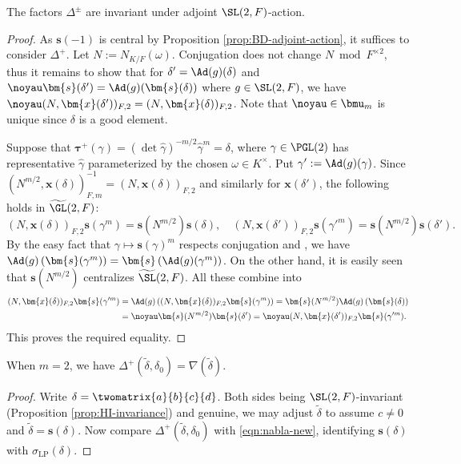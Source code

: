 \documentclass[a4paper,10pt]{article}
\begin{document}
\begin{proposition}\label{prop:HI-invariance}
	The factors $\Delta^\pm$ are invariant under adjoint $\SL(2,F)$-action.
\end{proposition}
\begin{proof}
	As $\bm{s}(-1)$ is central by Proposition \ref{prop:BD-adjoint-action}, it suffices to consider $\Delta^+$. Let $N := N_{K/F}(\omega)$. Conjugation does not change $N \bmod F^{\times 2}$, thus it remains to show that for $\delta' = \Ad(g)(\delta)$ and $\noyau \bm{s}(\delta') = \Ad(g)(\bm{s}(\delta))$ where $g \in \SL(2,F)$, we have $\noyau (N, \bm{x}(\delta'))_{F,2} = (N, \bm{x}(\delta))_{F,2}$. Note that $\noyau \in \bmu_m$ is unique since $\delta$ is a good element.
	
	Suppose that $\bm{\tau}^+(\gamma) = (\det\hat{\gamma})^{-m/2} \hat{\gamma}^m = \delta$, where $\gamma \in \PGL(2)$ has representative $\hat{\gamma}$ parameterized by the chosen $\omega \in K^\times$. Put $\gamma' := \Ad(g)(\gamma)$. Since $\left( N^{m/2}, \bm{x}(\delta) \right)^{-1}_{F, m} = (N, \bm{x}(\delta))_{F,2}$ and similarly for $\bm{x}(\delta')$, the following holds in $\widetilde{\GL}(2,F)$:
	\[ (N, \bm{x}(\delta))_{F,2} \bm{s}(\gamma^m) = \bm{s}(N^{m/2}) \bm{s}(\delta), \quad (N, \bm{x}(\delta'))_{F,2} \bm{s}(\gamma'^m) = \bm{s}(N^{m/2}) \bm{s}(\delta'). \]
	By the easy fact that $\gamma \mapsto \bm{s}(\gamma)^m$ respects conjugation and \cite[p.130 + Lemma 1.2.1]{Fl80}, we have $\Ad(g)\left( \bm{s}(\gamma^m) \right) = \bm{s}\left( \Ad(g)(\gamma^m) \right)$. On the other hand, it is easily seen that $\bm{s}(N^{m/2})$ centralizes $\widetilde{\SL}(2,F)$. All these combine into
	\begin{align*}
		(N, \bm{x}(\delta))_{F,2} \bm{s}(\gamma'^m) & = \Ad(g) \left( (N, \bm{x}(\delta))_{F,2} \bm{s}(\gamma^m) \right) = \bm{s}(N^{m/2}) \Ad(g) \left( \bm{s}(\delta) \right) \\
		& = \noyau \bm{s}(N^{m/2}) \bm{s}(\delta') = \noyau (N, \bm{x}(\delta'))_{F,2} \bm{s}(\gamma'^m).
	\end{align*}
	This proves the required equality.
\end{proof}

\begin{proposition}\label{prop:HI-Li}
	When $m=2$, we have $\Delta^+(\tilde{\delta}, \delta_0) = \nabla(\tilde{\delta})$.
\end{proposition}
\begin{proof}
	Write $\delta = \twomatrix{a}{b}{c}{d}$. Both sides being $\SL(2,F)$-invariant (Proposition \ref{prop:HI-invariance}) and genuine, we may adjust $\tilde{\delta}$ to assume $c \neq 0$ and $\tilde{\delta} = \bm{s}(\delta)$. Now compare $\Delta^+(\tilde{\delta}, \delta_0)$ with \eqref{eqn:nabla-new}, identifying $\bm{s}(\delta)$ with $\sigma_\text{LP}(\delta)$.
\end{proof}
\end{document}
